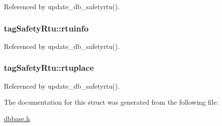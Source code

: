 Referenced by update\-\_\-db\-\_\-safetyrtu().

\hypertarget{structtagSafetyRtu_aad00f636b3c245ad895894fd41ad56dc}{
\subsubsection[{rtuinfo}]{ tag\-Safety\-Rtu\-::rtuinfo}}\label{structtagSafetyRtu_aad00f636b3c245ad895894fd41ad56dc}


Referenced by update\-\_\-db\-\_\-safetyrtu().

\hypertarget{structtagSafetyRtu_a9248c682eaf6771ebbbcf0a8501084d7}{
\subsubsection[{rtuplace}]{ tag\-Safety\-Rtu\-::rtuplace}}\label{structtagSafetyRtu_a9248c682eaf6771ebbbcf0a8501084d7}


Referenced by update\-\_\-db\-\_\-safetyrtu().



The documentation for this struct was generated from the following file\-:\begin{DoxyCompactItemize}
\item 
\hyperlink{dbbase_8h}{dbbase.\-h}\end{DoxyCompactItemize}
